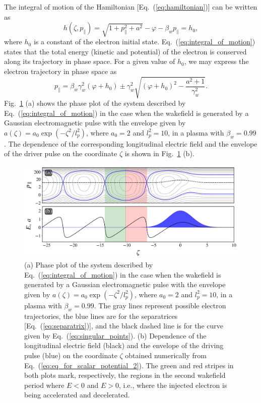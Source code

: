 \documentclass[10pt, a4paper, twoside, openright]{report}
\begin{document}
The integral of motion of the Hamiltonian [Eq.~(\ref{eq:hamiltonian})] can be written as \cite{Esirkepov2006, Esarey2009, Bulanov2013}
\begin{equation}\label{eq:integral_of_motion}
	h\left( \zeta, p_{\parallel} \right) = \sqrt{1 + p_{\parallel}^2 + a^2} - \varphi - \beta_w p_{\parallel} = h_0,
\end{equation}
where $ h_0 $ is a constant of the electron initial state. Eq.~(\ref{eq:integral_of_motion}) states that the total energy (kinetic and potential) of the electron is conserved along its trajectory in phase space. For a given value of $ h_0 $, we may express the electron trajectory in phase space as \cite{Schroeder2006, Esarey2009}
\begin{equation}\label{eq:electron_trajectories}
p_{\parallel} = \beta_w \gamma_w^2 \left( \varphi + h_0 \right) \pm \gamma_w^2 \sqrt{\left( \varphi + h_0 \right)^2 - \frac{a^2 + 1}{\gamma_w^2}}.
\end{equation}
Fig.~\ref{fig:phase_plot} (a) shows the phase plot of the system described by Eq.~(\ref{eq:integral_of_motion}) in the case when the wakefield is generated by a Gaussian electromagnetic pulse with the envelope given by $ a \left( \zeta \right) = a_0 \exp \left( -\zeta^2 / l_p^2 \right) $, where $ a_0 = 2 $ and $ l_p^2 = 10 $, in a plasma with $ \beta_w = 0.99 $. The dependence of the corresponding longitudinal electric field and the envelope of the driver pulse on the coordinate $ \zeta $ is shown in Fig.~\ref{fig:phase_plot} (b). 

\begin{figure}[t]
	\includegraphics[width=0.9\linewidth]{img/phase_plot.jpg}
	\caption[]{\label{fig:phase_plot} (a) Phase plot of the system described by Eq.~(\ref{eq:integral_of_motion}) in the case when the wakefield is generated by a Gaussian electromagnetic pulse with the envelope given by $ a \left( \zeta \right) = a_0 \exp \left( -\zeta^2 / l_p^2 \right) $, where $ a_0 = 2 $ and $ l_p^2 = 10 $, in a plasma with $ \beta_w = 0.99 $. The gray lines represent possible electron trajectories, the blue lines are for the separatrices [Eq.~(\ref{eq:separatrix})], and the black dashed line is for the curve given by Eq.~(\ref{eq:singular_points}). (b) Dependence of the longitudinal electric field (black) and the envelope of the driving pulse (blue) on the coordinate $ \zeta $ obtained numerically from Eq.~(\ref{eq:eq_for_scalar_potential_2}). The green and red stripes in both plots mark, respectively, the regions in the second wakefield period where $ E < 0 $ and $ E > 0 $, i.e., where the injected electron is being accelerated and decelerated.}
\end{figure}
\end{document}
